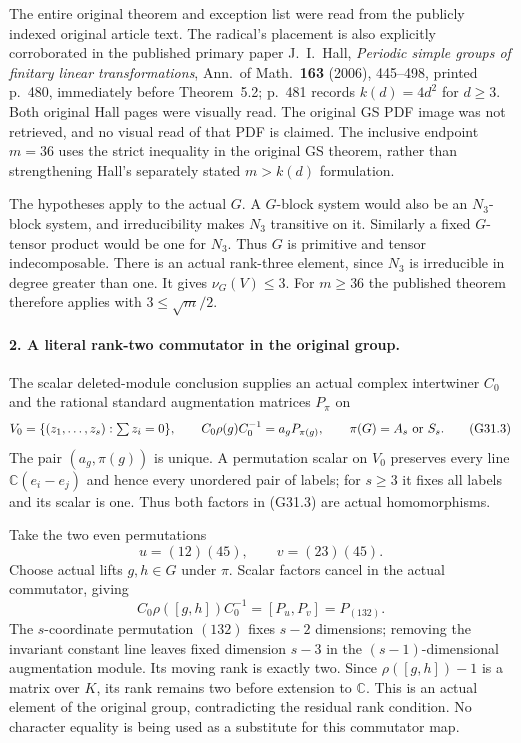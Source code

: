 The entire original theorem and exception list were read from the
publicly indexed original article text.  The radical's placement
is also explicitly corroborated in the published primary paper
J.~I.~Hall, \emph{Periodic simple groups of finitary linear
transformations}, Ann.~of Math.~\textbf{163} (2006), 445--498,
printed p.~480, immediately before Theorem~5.2; p.~481 records
$k(d)=4d^2$ for $d\ge3$.  Both original Hall pages were visually
read.  The original GS PDF image was not retrieved, and no visual
read of that PDF is claimed.  The inclusive endpoint $m=36$ uses
the strict inequality in the original GS theorem, rather than
strengthening Hall's separately stated $m>k(d)$ formulation.

The hypotheses apply to the actual $G$.  A $G$-block system would
also be an $N_3$-block system, and irreducibility makes $N_3$
transitive on it.  Similarly a fixed $G$-tensor product would be
one for $N_3$.  Thus $G$ is primitive and tensor indecomposable.
There is an actual rank-three element, since $N_3$ is irreducible
in degree greater than one.  It gives $\nu_G(V)\le3$.
For $m\ge36$ the published theorem therefore applies with
$3\le\sqrt m/2$.

\paragraph{2. A literal rank-two commutator in the original group.}
The scalar deleted-module conclusion supplies an actual complex
intertwiner $C_0$ and the rational standard augmentation matrices
$P_\pi$ on
\[
     V_0=\{(z_1,\ldots,z_s):\textstyle\sum z_i=0\},
      \qquad
     C_0\rho(g)C_0^{-1}=a_gP_{\pi(g)},\qquad
                   \pi(G)=A_s\ \hbox{or}\ S_s.             \tag{G31.3}
\]
The pair $(a_g,\pi(g))$ is unique.  A permutation scalar on
$V_0$ preserves every line $\mathbb C(e_i-e_j)$ and hence every
unordered pair of labels; for $s\ge3$ it fixes all labels and
its scalar is one.  Thus both factors in (G31.3) are actual
homomorphisms.

Take the two even permutations
\[
                 u=(12)(45),\qquad v=(23)(45).
\]
Choose actual lifts $g,h\in G$ under $\pi$.  Scalar factors
cancel in the actual commutator, giving
\[
 C_0\rho([g,h])C_0^{-1}
      =[P_u,P_v]=P_{(132)}.                                \tag{G31.4}
\]
The $s$-coordinate permutation $(132)$ fixes $s-2$ dimensions;
removing the invariant constant line leaves fixed dimension
$s-3$ in the $(s-1)$-dimensional augmentation module.  Its moving
rank is exactly two.  Since $\rho([g,h])-1$ is a matrix over
$K$, its rank remains two before extension to $\mathbb C$.
This is an actual element of the original group, contradicting
the residual rank condition.  No character equality is being
used as a substitute for this commutator map.

